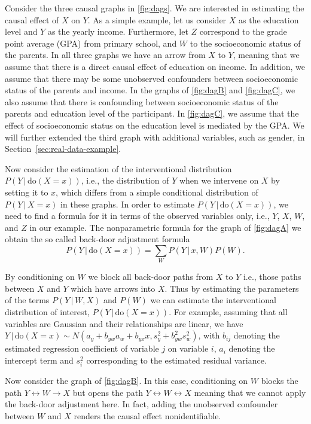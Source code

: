 \documentclass{statsoc}
\newcommand{\+}[1]{\ensuremath{\mathbf{#1}}}
\newcommand{\doo}{\textrm{do}}
\newcommand{\given}{{ \, | \, }}
\begin{document}
Consider the three causal graphs in \autoref{fig:dags}. We are interested in estimating the causal effect of $X$ on $Y$. As a simple example, let us consider $X$ as the education level and $Y$ as the yearly income. Furthermore, let $Z$ correspond to the grade point average (GPA) from primary school, and $W$ to the socioeconomic status of the parents. In all three graphs we have an arrow from $X$ to $Y$, meaning that we assume that there is a direct causal effect of education on income. In addition, we assume that there may be some unobserved confounders between socioeconomic status of the parents and income. In the graphs of \autoref{fig:dagB} and \autoref{fig:dagC}, we also assume that there is confounding between socioeconomic status of the parents and education level of the participant. In \autoref{fig:dagC}, we assume that the effect of socioeconomic status on the education level is mediated by  the GPA. We will further extended the third graph with additional variables, such as gender, in Section~\ref{sec:real-data-example}.

Now consider the estimation of the interventional distribution $P(Y \given \doo(X = x))$, i.e., the distribution of $Y$ when we intervene on $X$ by setting it to $x$, which differs from a simple conditional distribution of $P(Y \given X = x)$ in these graphs. In order to estimate $P(Y \given \doo(X = x))$, we need to find a formula for it in terms of the observed variables only, i.e., $Y$, $X$, $W$, and $Z$ in our example. The nonparametric formula for the graph of \autoref{fig:dagA} we obtain the so called back-door adjustment formula
\begin{equation*}
P(Y \given \doo(X = x)) = \sum_{W}P(Y\given x, W)P(W).
\end{equation*}

By conditioning on $W$ we block all back-door paths from $X$ to $Y$ i.e., those paths between $X$ and $Y$ which have arrows into $X$. Thus by estimating the parameters of the terms $P(Y \given W, X)$ and $P(W)$ we can estimate the interventional distribution of interest, $P(Y \given \doo(X = x))$. For example, assuming that all variables are Gaussian and their relationships are linear, we have $Y \given \doo(X = x) \sim N(a_y + b_{yw} a_w + b_{yx} x, s^2_y + b_{yw}^2 s^2_w)$, with $b_{ij}$ denoting the estimated regression coefficient of variable $j$ on variable $i$, $a_i$ denoting the intercept term and $s^2_i$ corresponding to the estimated residual variance.

Now consider the graph of \autoref{fig:dagB}. In this case, conditioning on $W$ blocks the path $Y \longleftrightarrow W \longrightarrow X$ but opens the path $Y \longleftrightarrow  W \longleftrightarrow X$ meaning that we cannot apply the back-door adjustment here. In fact, adding the unobserved confounder between $W$ and $X$ renders the causal effect nonidentifiable.
\end{document}

